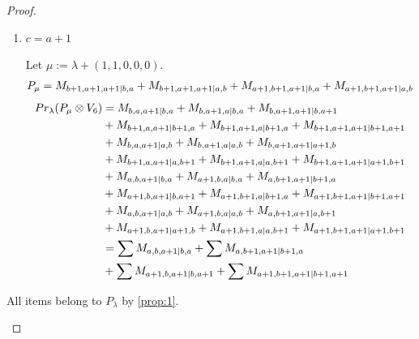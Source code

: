 \begin{proof}
\begin{enumerate}
\begin{enumerate}
        \item $c=a+1$ \par
        Let $\mu:=\lambda + (1,1,0,0,0) $.
        \begin{equation}\notag
          \begin{aligned}
            P_\mu = M_{b+1,a+1,a+1|b,a}
+ M_{b+1,a+1,a+1|a,b}
+ M_{a+1,b+1,a+1|b,a}
+ M_{a+1,b+1,a+1|a,b}
          \end{aligned}
        \end{equation}
        \begin{equation}\notag
          \begin{aligned}
            Pr_{\lambda}(P_\mu \otimes V_{6}) &=
M_{b,a,a+1|b,a}
+ M_{b,a+1,a|b,a}
+ M_{b,a+1,a+1|b,a+1}\\
                                               &
+ M_{b+1,a,a+1|b+1,a}
+ M_{b+1,a+1,a|b+1,a}
+ M_{b+1,a+1,a+1|b+1,a+1}\\
                                               &
+ M_{b,a,a+1|a,b}
+ M_{b,a+1,a|a,b}
+ M_{b,a+1,a+1|a+1,b}\\
                                               &
+ M_{b+1,a,a+1|a,b+1}
+ M_{b+1,a+1,a|a,b+1}
+ M_{b+1,a+1,a+1|a+1,b+1}\\
                                               &
+ M_{a,b,a+1|b,a}
+ M_{a+1,b,a|b,a}
+ M_{a,b+1,a+1|b+1,a}\\
                                               &
+ M_{a+1,b,a+1|b,a+1}
+ M_{a+1,b+1,a|b+1,a}
+ M_{a+1,b+1,a+1|b+1,a+1}\\
                                               &
+ M_{a,b,a+1|a,b}
+ M_{a+1,b,a|a,b}
+ M_{a,b+1,a+1|a,b+1}\\
                                               &
+ M_{a+1,b,a+1|a+1,b}
+ M_{a+1,b+1,a|a,b+1}
+ M_{a+1,b+1,a+1|a+1,b+1} \\
                                               &=
\sum M_{a,b,a+1|b,a}
+ \sum M_{a,b+1,a+1|b+1,a} \\
                                               &
+ \sum M_{a+1,b,a+1|b,a+1}
+ \sum M_{a+1,b+1,a+1|b+1,a+1}
          \end{aligned}
        \end{equation}
      \end{enumerate}
All items belong to $P_\lambda$ by \cref{prop:1}.


\end{enumerate}
\end{proof}
